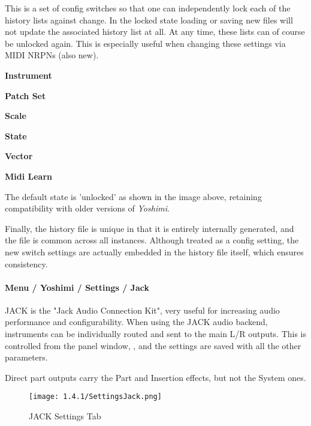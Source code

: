    This is a set of config switches so that one can independently lock each of
   the history lists against change. In the locked state loading or saving new
   files will not update the associated history list at all. At any time, these
   lists can of course be unlocked again. This is especially useful when changing
   these settings via MIDI NRPNs (also new).

   \begin{enumber}
      \item \textbf{Instrument}
      \item \textbf{Patch Set}
      \item \textbf{Scale}
      \item \textbf{State}
      \item \textbf{Vector}
      \item \textbf{Midi Learn}
   \end{enumber}

   The default state is 'unlocked' as shown in the image above, retaining
   compatibility with older versions of \textsl{Yoshimi}.

   Finally, the history file is unique in that it is entirely internally
   generated, and the file is common across all instances. Although treated as
   a config setting, the new switch settings are actually embedded in the
   history file itself, which ensures consistency.


\paragraph{Menu / Yoshimi / Settings / Jack}
\label{paragraph:menu_yoshimi_settings_jack}

   JACK is the "Jack Audio Connection Kit", very useful for increasing audio
   performance and configurability.
   When using the JACK audio backend, instruments can be individually routed
   and sent to the main L/R outputs. This is controlled from the
   panel window,
   ,
   and the settings are saved with all the other parameters.

   Direct part outputs carry the Part and Insertion effects, but not the
   System ones.

\begin{figure}[H]
   \centering
   \texttt{[image: 1.4.1/SettingsJack.png]}
   \caption[JACK Settings]{JACK Settings Tab}
   \label{fig:yoshimi_settings_jack_tab}
\end{figure}

